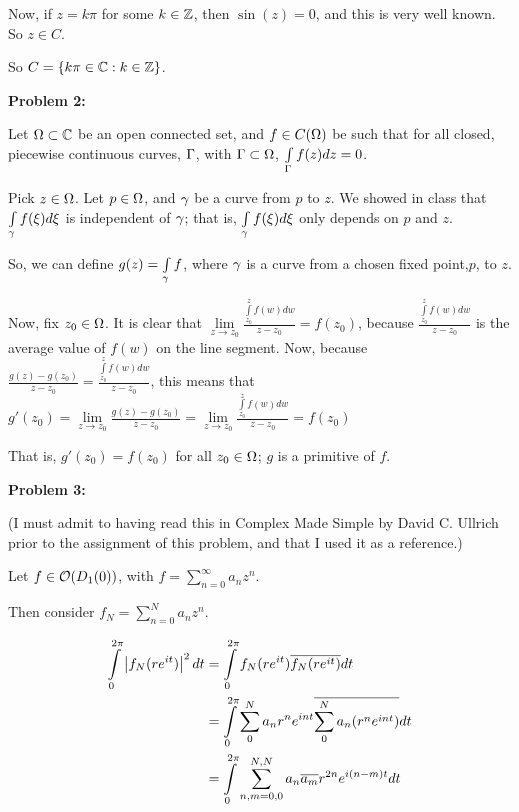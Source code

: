 \documentclass[a4paper,12pt]{article}
\begin{document}
Now, if $z = k\pi$ for some $k \in \mathbb{Z}$, then $\sin(z) = 0$, and this is very well known. So $z \in C$.

So $C = \{k\pi  \in \mathbb{C}: k \in \mathbb{Z}\}$.

\shunt

{\bf Problem 2:}

Let $\Omega \subset \mathbb{C}$ be an open connected set, and $f \in C(\Omega)$ be such that for all closed, piecewise continuous curves, $\Gamma$, with $\Gamma \subset \Omega$, $\int\limits_\Gamma f(z) dz = 0$.

Pick $z \in \Omega$. Let $p \in \Omega$, and $\gamma$ be a curve from $p$ to $z$. We showed in class that $\int\limits_\gamma f(\xi) d\xi$ is independent of $\gamma$; that is, $\int\limits_\gamma f(\xi) d\xi$ only depends on $p$ and $z$.

So, we can define $g(z) = \int\limits_\gamma f$, where $\gamma$ is a curve from a chosen fixed point,$p$, to $z$.

Now, fix $z_0 \in \Omega$. It is clear that $\lim\limits_{z\to z_0} \frac{\int\limits_{z_0}^z f(w) dw}{z-z_0} = f(z_0)$, because $ \frac{\int\limits_{z_0}^z f(w) dw}{z-z_0}$ is the average value of $f(w)$ on the line segment. Now, because $\frac{g(z)-g(z_0)}{z-z_0} = \frac{\int\limits_{z_0}^z f(w) dw}{z-z_0}$, this means that $g'(z_0) = \lim\limits_{z\to z_0}\frac{g(z)-g(z_0)}{z-z_0} = \lim\limits_{z\to z_0}\frac{\int\limits_{z_0}^z f(w) dw}{z-z_0} = f(z_0)$

That is, $g'(z_0) = f(z_0)$ for all $z_0 \in \Omega$; $g$ is a primitive of $f$.

\shunt

{\bf Problem 3:}

(I must admit to having read this in Complex Made Simple by David C. Ullrich prior to the assignment of this problem, and that I used it as a reference.)

Let $f \in \mathcal{O}(D_1(0))$, with $f = \sum\limits_{n=0}^\infty a_nz^n$.

Then consider $f_N = \sum\limits_{n=0}^N a_nz^n$.

\begin{align*}
\int\limits_0^{2\pi} \left\lvert f_N(re^{it}) \right\rvert^2 dt &= \int\limits_0^{2\pi} f_N(re^{it})\overline{f_N(re^{it})} dt\\
&= \int\limits_0^{2\pi} \sum\limits_0^N a_nr^ne^{int}\overline{\sum\limits_0^Na_n(r^ne^{int})} dt\\
&= \int\limits_0^{2\pi} \sum\limits_{n,m=0,0}^{N,N} a_n\overline{a_m}r^{2n}e^{i(n-m)t} dt\\
\end{align*}
\end{document}
